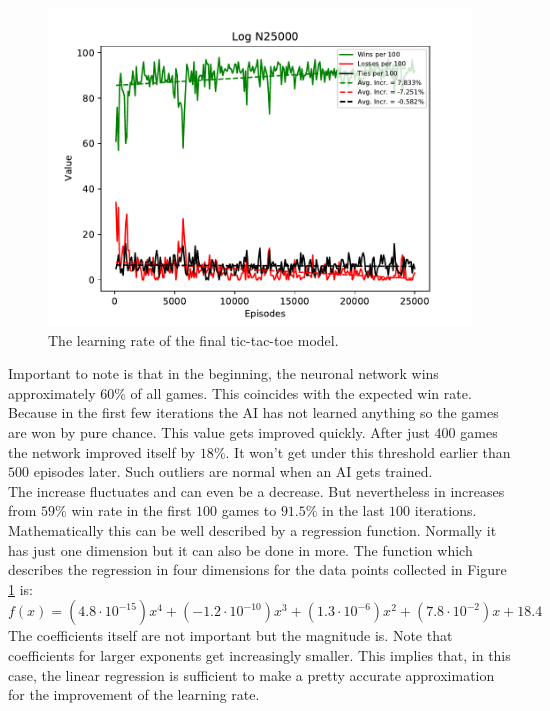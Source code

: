 \documentclass[12pt]{article}
\begin{document}
\begin{figure}[h]
\includegraphics[width=0.9\linewidth]{pictures/fig.2020.10.09-01.15.39-I.100-N.25000.pdf}
\caption{The learning rate of the final tic-tac-toe model.}
\label{fig:finalTTT}
\end{figure}
Important to note is that in the beginning, the \gls{neuronal network} wins approximately $60\%$ of all games. This coincides with the expected win rate. Because in the first few \glspl{iteration} the \gls{AI} has not learned anything so the games are won by pure chance. This value gets improved quickly. After just $400$ games the network improved itself by $18\%$. It won't get under this threshold earlier than $500$ \glspl{episode} later. Such outliers are normal when an \gls{AI} gets trained. \\
The increase fluctuates and can even be a decrease. But nevertheless in increases from $59\%$ win rate in the first $100$ games to $91.5\%$ in the last $100$ \glspl{iteration}. Mathematically this can be well described by a regression function. Normally it has just one dimension but it can also be done in more. The function which describes the regression in four dimensions for the data points collected in Figure \ref{fig:finalTTT} is:
\begin{equation}\nonumber
f(x) =(4.8\cdot10^{-15})x^{4}+(-1.2\cdot10^{-10})x^{3}+(1.3\cdot10^{-6})x^{2}+ (7.8 \cdot 10^{-2})x + 18.4
\end{equation}
The coefficients itself are not important but the magnitude is. Note that coefficients for larger exponents get increasingly smaller. This implies that, in this case, the linear regression is sufficient to make a pretty accurate approximation for the improvement of the learning rate.\\
\end{document}

